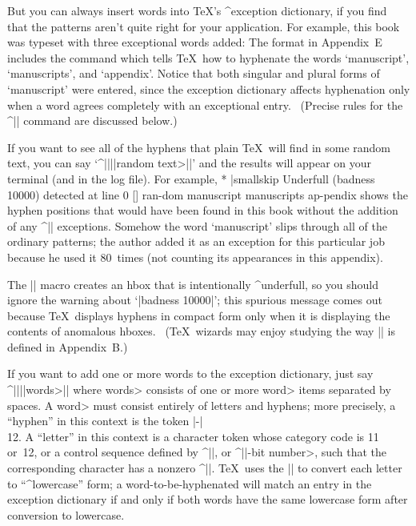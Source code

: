 But you can always insert words into \TeX's ^{exception dictionary}, if
you find that the patterns aren't quite right for your application.
For example, this book was typeset with three exceptional words added:
The format in Appendix~E includes the command
\begintt
{}
\endtt
which tells \TeX\ how to hyphenate the words `manuscript', `manuscripts',
and `appendix'. Notice that both singular and plural forms of
`manuscript' were entered, since the exception dictionary affects
hyphenation only when a word agrees completely with an exceptional
entry. \ (Precise rules for the ^|\hyphenation| command are
discussed below.)

If you want to see all of the hyphens that plain \TeX\ will find in some
random text, you can say `^|\showhyphens||{|\<random text>|}|' and the
results will appear on your terminal (and in the log file). For example,
\begintt
*
|smallskip
Underfull \hbox (badness 10000) detected at line 0
[] \tenrm ran-dom manuscript manuscripts ap-pendix
\endtt
shows the hyphen positions that would have been found in this book
without the addition of any ^|\hyphenation| exceptions. Somehow the word
`manuscript' slips through all of the ordinary patterns; the author added it
as an exception for this particular job because he used it 80~times (not
counting its appearances in this appendix).

The |\showhyphens| macro creates an hbox that is intentionally
^{underfull}, so you should ignore the warning about `|badness 10000|';
this spurious message comes out because \TeX\ displays hyphens in compact
form only when it is displaying the contents of anomalous
hboxes. \ (\TeX\ wizards may enjoy studying the way |\showhyphens|
is defined in Appendix~B.)

\danger If you want to add one or more words to the exception dictionary,
just say ^|\hyphenation||{|\<words>|}| where \<words> consists of one
or more \<word> items separated by spaces. A \<word> must consist entirely
of letters and hyphens; more precisely, a ``hyphen'' in this context is
the token |-|\\{12}. A ``letter'' in this context is a character token whose
category code is 11 or~12, or a control sequence defined by ^|\chardef|,
or ^|\char|-bit number>, such that the corresponding character has a nonzero
^|\lccode|. \TeX\ uses the |\lccode| to convert each letter to ``^{lowercase}''
form; a word-to-be-hyphenated will match an entry in the exception
dictionary if and only if both words have the same lowercase form after
conversion to lowercase.

